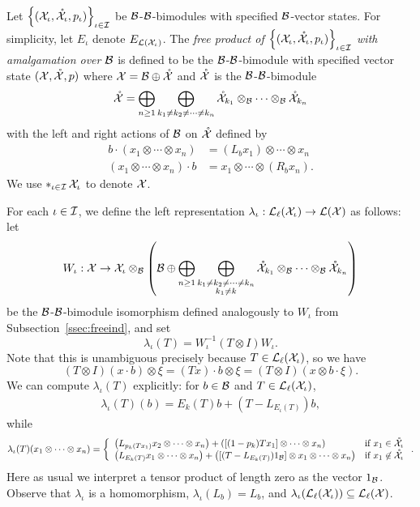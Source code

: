\begin{construction}
	\label{cons:freeproductconstruction}
	Let $\left\{(\mathcal{X}_{\iota}, \mathring{\mathcal{X}}_{\iota}, p_{\iota})\right\}_{\iota \in \mathcal{I}}$ be $\mathcal{B}$-$\mathcal{B}$-bimodules with specified $\mathcal{B}$-vector states.
	For simplicity, let $E_{\iota}$ denote $E_{\mathcal{L}(\mathcal{X}_{\iota})}$.
	The \emph{free product of $\left\{(\mathcal{X}_{\iota}, \mathring{\mathcal{X}}_{\iota}, p_{\iota})\right\}_{\iota \in \mathcal{I}}$ with amalgamation over $\mathcal{B}$} is defined to be the $\mathcal{B}$-$\mathcal{B}$-bimodule with specified vector state $(\mathcal{X}, \mathring{\mathcal{X}}, p)$
	where $\mathcal{X} = \mathcal{B} \oplus \mathring{\mathcal{X}}$ and $\mathring{\mathcal{X}}$ is the $\mathcal{B}$-$\mathcal{B}$-bimodule
	\begin{align*}
		\mathring{\mathcal{X}}=\bigoplus_{n\geq 1}\bigoplus_{k_1\neq k_2\neq\cdots\neq k_n} \mathring{\mathcal{X}}_{k_1}\otimes_{\mathcal{B}}\cdots\otimes_{\mathcal{B}}\mathring{\mathcal{X}}_{k_n}
	\end{align*}
	with the left and right actions of $\mathcal{B}$ on $\mathring{\mathcal{X}}$ defined by
	\begin{align*}
		b \cdot (x_1\otimes\cdots\otimes x_n) &= (L_b x_1)\otimes\cdots\otimes x_n\\
		(x_1\otimes\cdots\otimes x_n) \cdot b&= x_1\otimes\cdots\otimes (R_b x_n).
	\end{align*}
	We use $\mathop{\ast}_{\iota \in \mathcal{I}} \mathcal{X}_{\iota}$ to denote $\mathcal{X}$.

	For each $\iota \in \mathcal{I}$, we define the left representation $\lambda_{\iota} : \mathcal{L}_\ell(\mathcal{X}_{\iota}) \to \mathcal{L}(\mathcal{X})$ as follows:
	let
	\[
		W_{\iota} : \mathcal{X} \to \mathcal{X}_{\iota} \otimes_{\mathcal{B}} \left(\mathcal{B}\oplus \bigoplus_{n\geq 1}\bigoplus_{\substack{k_1\neq k_2\neq \cdots \neq k_n\\k_1\neq k}} \mathring{\mathcal{X}}_{k_1}\otimes_{\mathcal{B}}\cdots\otimes_{\mathcal{B}}\mathring{\mathcal{X}}_{k_n}\right)
	\]
	be the $\mathcal{B}$-$\mathcal{B}$-bimodule isomorphism defined analogously to $W_\iota$ from Subsection~\ref{ssec:freeind}, and set
	\[
		\lambda_{\iota}(T) = W_{\iota}^{-1}(T \otimes I)W_{\iota}.
	\]
	Note that this is unambiguous precisely because $T \in \mathcal{L}_\ell(\mathcal{X}_\iota)$, so we have
	$$(T\otimes I)(x\cdot b)\otimes \xi = (Tx)\cdot b \otimes \xi = (T\otimes I)(x \otimes b\cdot \xi).$$
	We can compute $\lambda_\iota(T)$ explicitly: for $b \in \mathcal{B}$ and $T \in \mathcal{L}_\ell(\mathcal{X}_\iota)$,
	\begin{align*}
		\lambda_{\iota}(T) (b) = E_{k}(T)b + (T-L_{E_{\iota}(T)})b,
	\end{align*}
	while
	\begin{align*}
		\lambda_{\iota}(T) (x_1\otimes\cdots \otimes x_n) =\left\{
			\begin{array}{ll}
				\left(L_{p_{k}(Tx_1)} x_2\otimes\cdots\otimes x_n \right) + \left(
				[(1-p_{k})Tx_1]\otimes\cdots \otimes x_n \right) & \text{if }x_1\in \mathring{\mathcal{X}}_{\iota}\\
				\left(L_{E_{k}(T)} x_1\otimes\cdots\otimes x_n\right) + \left([(T-L_{E_{k}(T)})1_{\mathcal{B}}]\otimes x_1\otimes\cdots\otimes x_n \right) & \text{if }x_1\not\in\mathring{\mathcal{X}}_{\iota}
		\end{array}\right..
	\end{align*}
	Here as usual we interpret a tensor product of length zero as the vector $1_{\mathcal{B}}$.
	Observe that $\lambda_{\iota}$ is a homomorphism, $\lambda_{\iota}(L_b)=L_b$, and $\lambda_{\iota}(\mathcal{L}_\ell(\mathcal{X}_{\iota})) \subseteq \mathcal{L}_\ell(\mathcal{X})$.


\end{construction}
